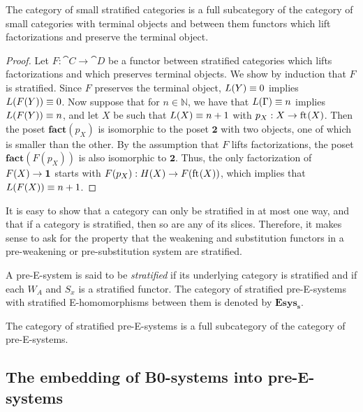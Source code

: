 \begin{lem}
The category of small stratified categories is a full subcategory of the category
of small categories with terminal objects and between them functors which lift 
factorizations and preserve the terminal object.
\end{lem}

\begin{proof}
Let $F:\cat{C}\to\cat{D}$ be a functor between stratified categories which lifts
factorizations and 
which preserves terminal objects. We show by induction that $F$ is stratified.
Since $F$ preserves the terminal object, $L(Y)\equiv 0$ implies $L(F(Y))\equiv 0$.
Now suppose that for $n\in\mathbb{N}$, we have that $L(\Gamma)\equiv n$ implies
$L(F(Y))\equiv n$, and let $X$ be such that $L(X)\equiv n+1$ with
$p_X:X\to\mathrm{ft}_{}(X)$. Then the poset $\mathbf{fact}(p_X)$ is isomorphic to the
poset $\mathbf{2}$ with two objects, one of which is smaller than the other. By the
assumption that $F$ lifts factorizations, the poset $\mathbf{fact}(F(p_X))$
is also isomorphic to $\mathbf{2}$. Thus, the only factorization
of $F(X)\to\mathbf{1}$ starts with $F(p_X):H(X)\to F(\mathrm{ft}_{}(X))$, which implies that
$L(F(X))\equiv n+1$. 
\end{proof}

\begin{rmk}
It is easy to show that a category can only be stratified in at most one way,
and that if a category is stratified, then so are any of its slices. Therefore,
it makes sense to ask for the property that the weakening and substitution
functors in a pre-weakening or pre-substitution system are stratified.
\end{rmk}

\begin{defn}
A pre-E-system is said to be \emph{stratified} if its underlying category is
stratified and if each $W_A$ and $S_x$ is a stratified functor. The category of
stratified pre-E-systems with stratified E-homomorphisms between them is denoted by
$\mathbf{Esys_s}$.
\end{defn}

\begin{cor}\label{lem:strat_full}
The category of stratified pre-E-systems is a full subcategory of the category of
pre-E-systems.
\end{cor}

\subsection{The embedding of B0-systems into pre-E-systems}

